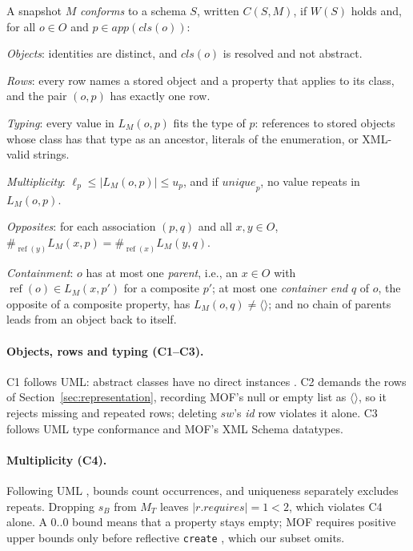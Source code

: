\begin{definition}[Conformance]\label{def:conformance}
A snapshot $M$ \emph{conforms} to a schema $S$, written $C(S,M)$, if $W(S)$
holds and, for all $o\in O$ and $p\in\mathit{app}(\mathit{cls}(o))$:
\begin{list}{}{\setlength{\leftmargin}{9mm}\setlength{\labelwidth}{8mm}%
 \setlength{\itemsep}{1pt}\setlength{\parsep}{0pt}\setlength{\topsep}{2pt}}
\item[(C1)] \emph{Objects}: identities are distinct, and $\mathit{cls}(o)$ is
 resolved and not abstract.
\item[(C2)] \emph{Rows}: every row names a stored object and a property that
 applies to its class, and the pair $(o,p)$ has exactly one row.
\item[(C3)] \emph{Typing}: every value in $L_M(o,p)$ fits the type of $p$:
 references to stored objects whose class has that type as an ancestor, literals
 of the enumeration, or XML-valid strings.
\item[(C4)] \emph{Multiplicity}: $\ell_p\leq|L_M(o,p)|\leq u_p$, and if
 $\mathit{unique}_p$, no value repeats in $L_M(o,p)$.
\item[(C5)] \emph{Opposites}: for each association $(p,q)$ and all $x,y\in O$,
 $\#_{\operatorname{ref}(y)}L_M(x,p)=\#_{\operatorname{ref}(x)}L_M(y,q)$.
\item[(C6)] \emph{Containment}: $o$ has at most one \emph{parent}, i.e., an
 $x\in O$ with $\operatorname{ref}(o)\in L_M(x,p')$ for a composite $p'$; at most
 one \emph{container end} $q$ of $o$, the opposite of a composite property, has
 $L_M(o,q)\neq\langle\rangle$; and no chain of parents leads from an object back
 to itself.
\end{list}
\end{definition}

\paragraph{Objects, rows and typing (C1--C3).}
C1 follows UML: abstract classes have no direct instances \cite{omg_uml_25}.
C2 demands the rows of Section~\ref{sec:representation}, recording MOF's null
or empty list \cite{omg_mof_251} as $\langle\rangle$, so it rejects missing and
repeated rows; deleting $\mathit{sw}$'s \emph{id} row violates it alone. C3
follows UML type conformance and MOF's XML Schema datatypes.

\paragraph{Multiplicity (C4).}
Following UML \cite{omg_uml_25}, bounds count occurrences, and uniqueness
separately excludes repeats. Dropping $s_B$ from $M_T$ leaves
$|r.\mathit{requires}|=1<2$, which violates C4 alone. A $0..0$ bound means that
a property stays empty; MOF requires positive upper bounds only before
reflective \texttt{create} \cite[\S9.3.3]{omg_mof_251}, which our subset omits.

